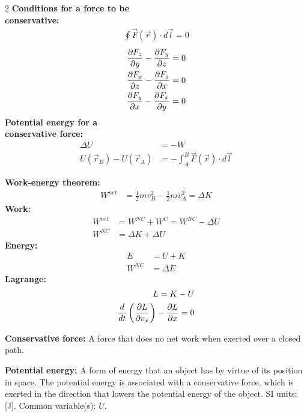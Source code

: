 \newpage
\begin{importantEquations}
\begin{multicols}{2}
\textbf{Conditions for a force to be\\ conservative:}
\begin{align*}
\oint \vec F(\vec r) \cdot d\vec l = 0
\end{align*}
\begin{align*}
\frac{\partial F_z}{\partial y}-\frac{\partial F_y}{\partial z} &= 0 \nonumber\\
\frac{\partial F_x}{\partial z}-\frac{\partial F_z}{\partial x} &= 0\nonumber\\
\frac{\partial F_y}{\partial x}-\frac{\partial F_x}{\partial y} &= 0
\end{align*}
\textbf{Potential energy for a\\ conservative force:}
\begin{align*}
\Delta U&=-W\\
U(\vec r_B) - U(\vec r_A)&= - \int_A^B \vec F(\vec r) \cdot d\vec l
\end{align*}
\columnbreak

\textbf{Work-energy theorem:}
\begin{align*}
W^{net}&=\frac{1}{2}mv_B^2-\frac{1}{2}mv_A^2=\Delta K
\end{align*}
\textbf{Work:}
\begin{align*}
W^{net}&=W^{NC}+W^{C}=W^{NC}-\Delta U\\
W^{NC}&=\Delta K+\Delta U
\end{align*}
\textbf{Energy:}
\begin{align*}
E&=U+K\\
W^{NC}&=\Delta E
\end{align*}
\textbf{Lagrange:}
\begin{align*}
L = K - U\\
\frac{d}{dt}\left(\frac{\partial L}{\partial v_x}\right)-\frac{\partial L}{\partial x} = 0
\end{align*}
\end{multicols}
\end{importantEquations}

\begin{definitions}
	\item \textbf{Conservative force:} A force that does no net work when exerted over a closed path.
	\item \textbf{Potential energy:} A form of energy that an object has by virtue of its position in space. The potential energy is associated with a conservative force, which is exerted in the direction that lowers the potential energy of the object. SI units: [\si{J}]. Common variable(s): $U$.
\end{definitions}

